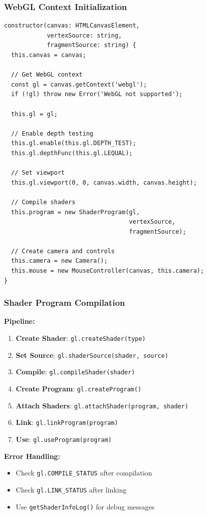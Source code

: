 \begin{frame}[fragile]
\frametitle{WebGL Context Initialization}

\begin{lstlisting}
constructor(canvas: HTMLCanvasElement, 
            vertexSource: string, 
            fragmentSource: string) {
  this.canvas = canvas;
  
  // Get WebGL context
  const gl = canvas.getContext('webgl');
  if (!gl) throw new Error('WebGL not supported');
  
  this.gl = gl;
  
  // Enable depth testing
  this.gl.enable(this.gl.DEPTH_TEST);
  this.gl.depthFunc(this.gl.LEQUAL);
  
  // Set viewport
  this.gl.viewport(0, 0, canvas.width, canvas.height);
  
  // Compile shaders
  this.program = new ShaderProgram(gl, 
                                   vertexSource, 
                                   fragmentSource);
  
  // Create camera and controls
  this.camera = new Camera();
  this.mouse = new MouseController(canvas, this.camera);
}
\end{lstlisting}
\end{frame}

\begin{frame}
\frametitle{Shader Program Compilation}

\textbf{Pipeline:}
\begin{enumerate}
  \item \textbf{Create Shader}: \texttt{gl.createShader(type)}
  \item \textbf{Set Source}: \texttt{gl.shaderSource(shader, source)}
  \item \textbf{Compile}: \texttt{gl.compileShader(shader)}
  \item \textbf{Create Program}: \texttt{gl.createProgram()}
  \item \textbf{Attach Shaders}: \texttt{gl.attachShader(program, shader)}
  \item \textbf{Link}: \texttt{gl.linkProgram(program)}
  \item \textbf{Use}: \texttt{gl.useProgram(program)}
\end{enumerate}

\vspace{0.5cm}

\textbf{Error Handling:}
\begin{itemize}
  \item Check \texttt{gl.COMPILE\_STATUS} after compilation
  \item Check \texttt{gl.LINK\_STATUS} after linking
  \item Use \texttt{getShaderInfoLog()} for debug messages
\end{itemize}
\end{frame}

